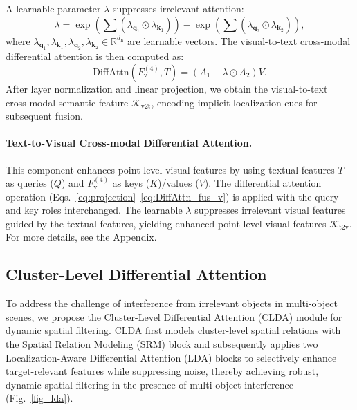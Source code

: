 \documentclass[letterpaper]{article} %
\begin{document}
A learnable parameter $\lambda$ suppresses irrelevant attention:
\[
\lambda = \exp\left(\sum (\lambda_{\mathbf{q}_1} \odot \lambda_{\mathbf{k}_1})\right) - \exp\left(\sum (\lambda_{\mathbf{q}_2} \odot \lambda_{\mathbf{k}_2})\right),
\]
where $\lambda_{\mathbf{q}_1}, \lambda_{\mathbf{k}_1}, \lambda_{\mathbf{q}_2}, \lambda_{\mathbf{k}_2} \in \mathbb{R}^{d_\mathrm{h}}$ are learnable vectors. The visual-to-text cross-modal differential attention is then computed as:
\begin{equation}
	\text{DiffAttn}(F_{\mathrm{v}}^{(4)}, T) = (A_1 - \lambda \odot A_2)V.
	\label{eq:DiffAttn_fus_v}
\end{equation}
After layer normalization and linear projection, we obtain the visual-to-text cross-modal semantic feature $\mathcal{K}_\mathrm{v2t}$, encoding implicit localization cues for subsequent fusion.


\paragraph{Text-to-Visual Cross-modal Differential Attention.} This component enhances point-level visual features by using textual features $T$ as queries ($Q$) and $F_{\mathrm{v}}^{(4)}$ as keys ($K$)/values ($V$). The differential attention operation (Eqs.~\ref{eq:projection}--\ref{eq:DiffAttn_fus_v}) is applied with the query and key roles interchanged. The learnable $\lambda$ suppresses irrelevant visual features guided by the textual features, yielding enhanced point-level visual features $\mathcal{K}_\mathrm{t2v}$. For more details, see the Appendix.




\subsection{Cluster-Level Differential Attention}
\label{sec:CLDA}

To address the challenge of interference from irrelevant objects in multi-object scenes, we propose the Cluster-Level Differential Attention (CLDA) module for dynamic spatial filtering. CLDA first models cluster-level spatial relations with the Spatial Relation Modeling (SRM) block and subsequently applies two Localization-Aware Differential Attention (LDA) blocks to selectively enhance target-relevant features while suppressing noise, thereby achieving robust, dynamic spatial filtering in the presence of multi-object interference (Fig.~\ref{fig_lda}).
\end{document}
